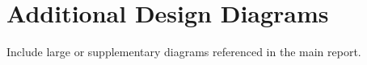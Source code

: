 \chapter{Additional Design Diagrams}
Include large or supplementary diagrams referenced in the main report.

